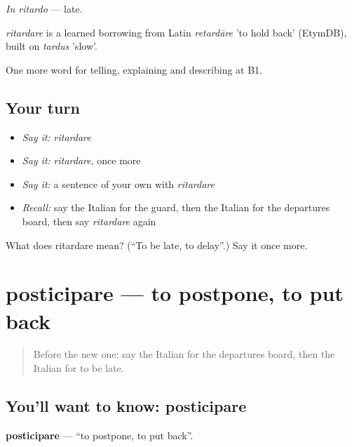 \emph{In ritardo} — late.

\begin{cousinweb}
\emph{ritardare} is a learned borrowing from Latin \emph{retardāre} 'to hold back' (EtymDB), built on \emph{tardus} 'slow'.
\end{cousinweb}

\begin{grammarlens}[title={What you've built}]
One more word for telling, explaining and describing at B1.
\end{grammarlens}

\subsection*{Your turn}
\begin{itemize}
\raggedright
  \item \emph{Say it:} \emph{ritardare}
  \item \emph{Say it:} \emph{ritardare}, once more
  \item \emph{Say it:} a sentence of your own with \emph{ritardare}
  \item \emph{Recall:} say the Italian for the guard, then the Italian for the departures board, then say \emph{ritardare} again
\end{itemize}

\begin{tcolorbox}[breakable,colback=teal!4,colframe=teal!35!black,title={Before you move on}]
What does ritardare mean? (\textquotedblleft{}To be late, to delay\textquotedblright{}.) Say it once more.
\end{tcolorbox}
\section[posticipare]{posticipare — to postpone, to put back}

\label{lesson:IT-C420-posticipare}



\begin{quote}
Before the new one: say the Italian for the departures board, then the Italian for to be late.
\end{quote}

\subsection*{You'll want to know: posticipare}
\textbf{posticipare} — \textquotedblleft{}to postpone, to put back\textquotedblright{}.

